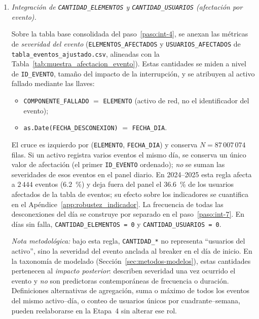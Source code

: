 {\begin{enumerate}
        \item\label{paso:int-5} \textit{Integración de \texttt{CANTIDAD\_ELEMENTOS} y \texttt{CANTIDAD\_USUARIOS} (afectación por evento).}\mbox{}\par\vspace{0.2em}\noindent
        Sobre la tabla base consolidada del paso~\ref{paso:int-4}, se anexan las métricas de \textit{severidad del evento} (\texttt{ELEMENTOS\_AFECTADOS} y \texttt{USUARIOS\_AFECTADOS} de \texttt{tabla\_eventos\_ajustado.csv}, alineadas con la Tabla~\ref{tab:muestra_afectacion_evento}). Estas cantidades se miden a nivel de \texttt{ID\_EVENTO}, tamaño del impacto de la interrupción, y se atribuyen al activo fallado mediante las llaves:
        \begin{itemize}
            \item \texttt{COMPONENTE\_FALLADO} $=$ \texttt{ELEMENTO} (activo de red, no el identificador del evento);
            \item \texttt{as.Date(FECHA\_DESCONEXION)} $=$ \texttt{FECHA\_DIA}.
        \end{itemize}
        El cruce es izquierdo por (\texttt{ELEMENTO}, \texttt{FECHA\_DIA}) y conserva $N = 87\,007\,074$ filas. Si un activo registra varios eventos el mismo día, se conserva un único valor de afectación (el primer \texttt{ID\_EVENTO} ordenado); \textit{no} se suman las severidades de esos eventos en el panel diario. En 2024--2025 esta regla afecta a $2\,444$ eventos ($6{.}2$~\%) y deja fuera del panel el $36{.}6$~\% de los usuarios afectados de la tabla de eventos; su efecto sobre los indicadores se cuantifica en el Apéndice~\ref{app:robustez_indicador}. La frecuencia de todas las desconexiones del día se construye por separado en el paso~\ref{paso:int-7}. En días sin falla, \texttt{CANTIDAD\_ELEMENTOS = 0} y \texttt{CANTIDAD\_USUARIOS = 0}.
        
        \noindent\textit{Nota metodológica:} bajo esta regla, \texttt{CANTIDAD\_*} no representa ``usuarios del activo'', sino la severidad del evento anclada al breaker en el día de inicio. En la taxonomía de modelado (Sección~\ref{sec:metodos-modelos}), estas cantidades pertenecen al \textit{impacto posterior}: describen severidad una vez ocurrido el evento y \textit{no} son predictoras contemporáneas de frecuencia o duración. Definiciones alternativas de agregación, suma o máximo de todos los eventos del mismo activo--día, o conteo de usuarios únicos por cuadrante--semana, pueden reelaborarse en la Etapa~4 sin alterar ese rol.
    

\end{enumerate}}
